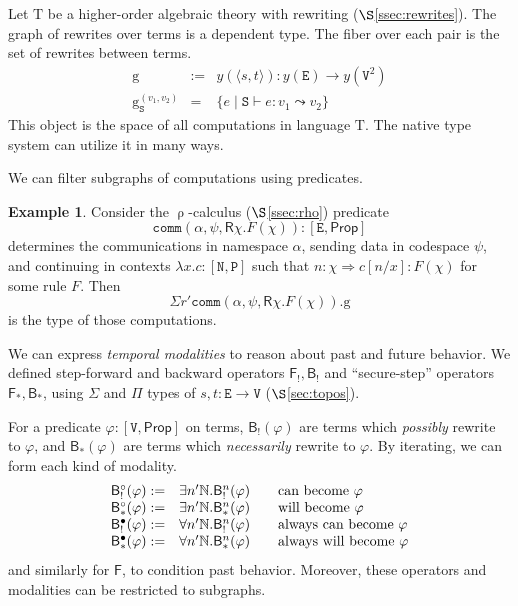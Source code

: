 \documentclass[12pt]{article}
\theoremstyle{definition}
\newtheorem{example}[theorem]{Example}
\newcommand{\msf}[1]{\mathsf{#1}}
\newcommand{\mbb}[1]{\mathbb{#1}}
\newcommand{\mrm}[1]{\mathrm{#1}}
\newcommand{\mtt}[1]{\mathtt{#1}}
\newcommand{\ra}{\Rightarrow}
\newcommand{\T}{\mrm{T}}
\newcommand{\Prop}{\msf{Prop}}
\newcommand{\tts}{\mtt{S}}
\newcommand{\N}{\mtt{N}}
\newcommand{\PP}{\mtt{P}}
\begin{document}
Let $\T$ be a higher-order algebraic theory with rewriting ($\S$\ref{ssec:rewrites}). The graph of rewrites over terms is a dependent type. The fiber over each pair is the set of rewrites between terms.
\[\begin{array}{lcl}
    \mrm{g} & := & y(\langle s,t\rangle): y(\mtt{E})\to y(\mtt{V}^2)\\
    \mrm{g}_\tts^{(v_1,v_2)} & = & \{e \;|\; \tts\vdash e:v_1 \leadsto v_2\}
\end{array}\]
This object is the space of all computations in language $\T$. The native type system can utilize it in many ways.

We can filter subgraphs of computations using predicates.
\begin{example}
    Consider the $\uprho$-calculus ($\S$\ref{ssec:rho}) predicate
    \[\mtt{comm}(\alpha,\psi,\msf{R}\chi.F(\chi)):[\mtt{E},\Prop]\]
    determines the communications in namespace $\alpha$, sending data in codespace $\psi$, and continuing in contexts $\lambda x.c:[\N,\PP]$ such that $n:\chi\ra c[n/x]:F(\chi)$ for some rule $F$. Then 
    \[\Sigma r'\mtt{comm}(\alpha,\psi,\msf{R}\chi.F(\chi)).\mrm{g}\]
    is the type of those computations.
\end{example}

We can express \textit{temporal modalities} to reason about past and future behavior. We defined step-forward and backward operators $\msf{F}_!,\msf{B}_!$ and ``secure-step'' operators $\msf{F}_*,\msf{B}_*$, using $\Sigma$ and $\Pi$ types of $s,t:\mtt{E}\to \mtt{V}$ ($\S$\ref{sec:topos}).

For a predicate $\varphi:[\mtt{V},\Prop]$ on terms, $\msf{B}_!(\varphi)$ are terms which \textit{possibly} rewrite to $\varphi$, and $\msf{B}_*(\varphi)$ are terms which \textit{necessarily} rewrite to $\varphi$. By iterating, we can form each kind of modality.
\[\begin{array}{ll@{\qquad}l}
    \msf{B}_!^\circ(\varphi) := & \exists n'\mbb{N}.\msf{B}_!^n(\varphi) & \text{can become } \varphi\\
    \msf{B}_*^\circ(\varphi) := & \exists n'\mbb{N}.\msf{B}_*^n(\varphi) & \text{will become } \varphi\\
    \msf{B}_!^\bullet(\varphi) := & \forall n'\mbb{N}.\msf{B}_!^n(\varphi) & \text{always can become } \varphi\\
    \msf{B}_*^\bullet(\varphi) := & \forall n'\mbb{N}.\msf{B}_*^n(\varphi) & \text{always will become } \varphi
\end{array}\]
and similarly for $\msf{F}$, to condition past behavior. Moreover, these operators and modalities can be restricted to subgraphs.
\end{document}
